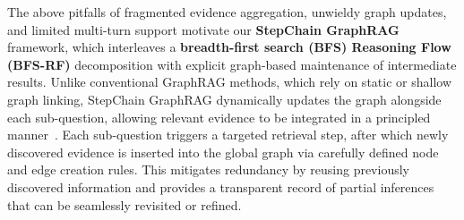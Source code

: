 \documentclass[runningheads]{llncs}
\begin{document}

The above pitfalls of fragmented evidence aggregation, unwieldy graph updates, and limited multi-turn support motivate our \textbf{StepChain GraphRAG} framework, which interleaves a \textbf{breadth-first search (BFS) Reasoning Flow (BFS-RF)} decomposition with explicit graph-based maintenance of intermediate results. Unlike conventional GraphRAG methods, which rely on static or shallow graph linking, StepChain GraphRAG dynamically updates the graph alongside each sub-question, allowing relevant evidence to be integrated in a principled manner~\cite{edge2024local}. Each sub-question triggers a targeted retrieval step, after which newly discovered evidence is inserted into the global graph via carefully defined node and edge creation rules. This mitigates redundancy by reusing previously discovered information and provides a transparent record of partial inferences that can be seamlessly revisited or refined. 
\end{document}
